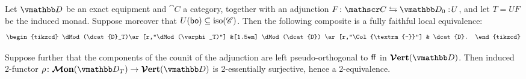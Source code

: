 \documentclass[11pt,oneside,article]{memoir}
\begin{document}
\begin{theorem}\label{thm:ffle_and_verts}
   Let $\dcat{D}$ be an exact equipment and $\cat{C}$ a category, together with an adjunction
   $F\colon\cat{C}\leftrightarrows\dcat{D}_0:\!U$, and let $T=UF$ be the induced monad. Suppose
   moreover that $U(\mathsf{bo})\subseteq\mathrm{iso}(\mathscr{C})$. Then the following composite is a fully faithful local equivalence:
   \begin{equation*}
      \begin{tikzcd}
         \dMod(\dcat{D}_T)\ar[r,"\dMod(\varphi_T)"] &[1.5em] \dMod(\dcat{D}) \ar[r,"\Col{\textrm{--}}"] & \dcat{D}.
      \end{tikzcd}
   \end{equation*}

   Suppose further that the components of the counit of
   the adjunction are left pseudo-orthogonal to $\mathsf{ff}$ in $\VVer(\dcat{D})$. Then induced 2-functor
   $\rho\colon\MMon(\dcat{D}_T)\to\VVer(\dcat{D})$ is 2-essentially surjective, hence a 2-equivalence.
\end{theorem}
\end{document}
